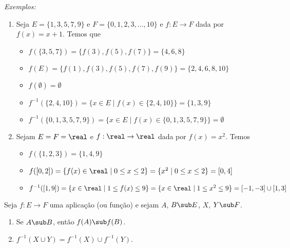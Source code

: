 {\it Exemplos:}
\begin{enumerate}
\item Seja $E = \{1, 3, 5, 7, 9 \}$ e $F = \{0, 1, 2, 3, \dots, 10\}$ e $f : E \to F$ dada por $f(x) = x + 1$. Temos que
\begin{itemize}
\item $f(\{3, 5, 7\}) = \{f(3), f(5), f(7)\} = \{4, 6, 8\}$

\item $f(E) = \{f(1), f(3), f(5), f(7), f(9)\} = \{2, 4, 6, 8, 10\}$

\item $f(\emptyset) = \emptyset$

\item $f^{-1}(\{2, 4, 10\}) = \{x \in E \mid f(x) \in \{2, 4, 10\}\} = \{1, 3, 9\}$

\item $f^{-1}(\{0, 1, 3, 5, 7, 9\}) = \{x \in E \mid f(x) \in \{0, 1, 3, 5, 7, 9\}\} = \emptyset$
\end{itemize}

\item Sejam $E = F= \real$ e $f : \real \to \real$ dada por $f(x) = x^2$. Temos
\begin{itemize}
\item $f(\{1, 2, 3\}) = \{1, 4, 9\}$

\item $f([0,2]) = \{f(x) \in \real \mid 0 \le x \le 2 \} = \{x^2 \mid 0 \le x \le 2\} = [0, 4]$

\item $f^{-1}([1, 9]) = \{ x \in \real \mid 1 \le f(x) \le 9\} = \{x \in \real \mid 1 \le x^2 \le 9\} = [-1, -3] \cup [1, 3]$
\end{itemize}
\end{enumerate}

\begin{proposicao}
Seja $f : E \to F$ uma aplica{\c c}{\~a}o (ou fun{\c c}{\~a}o) e sejam $A$, $B \sub E$, $X$, $Y \sub F$.
\begin{enumerate}
\item Se $A \sub B$, ent{\~a}o $f(A) \sub f(B)$.

\item $f^{-1}(X \cup Y) = f^{-1}(X) \cup f^{-1}(Y)$.
\end{enumerate}
\end{proposicao}

